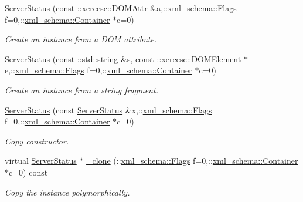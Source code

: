 \begin{DoxyCompactItemize}
\hyperlink{classopenstack_1_1xml_1_1ServerStatus_a18de8828142096479b1a0a79980ad557}{ServerStatus} (const ::xercesc::DOMAttr \&a,::\hyperlink{namespacexml__schema_affb4c227cbd9aa7453dd1dc5a1401943}{xml\_\-schema::Flags} f=0,::\hyperlink{namespacexml__schema_a333dea2213742aea47a37532dec4ec27}{xml\_\-schema::Container} $\ast$c=0)
\begin{DoxyCompactList}\small\item\em Create an instance from a DOM attribute. \item\end{DoxyCompactList}\item 
\hyperlink{classopenstack_1_1xml_1_1ServerStatus_a1a147728fb68d1f9d61eee5f32bae836}{ServerStatus} (const ::std::string \&s, const ::xercesc::DOMElement $\ast$e,::\hyperlink{namespacexml__schema_affb4c227cbd9aa7453dd1dc5a1401943}{xml\_\-schema::Flags} f=0,::\hyperlink{namespacexml__schema_a333dea2213742aea47a37532dec4ec27}{xml\_\-schema::Container} $\ast$c=0)
\begin{DoxyCompactList}\small\item\em Create an instance from a string fragment. \item\end{DoxyCompactList}\item 
\hyperlink{classopenstack_1_1xml_1_1ServerStatus_aeb999d1270a453047b82fbdaa75e25c2}{ServerStatus} (const \hyperlink{classopenstack_1_1xml_1_1ServerStatus}{ServerStatus} \&x,::\hyperlink{namespacexml__schema_affb4c227cbd9aa7453dd1dc5a1401943}{xml\_\-schema::Flags} f=0,::\hyperlink{namespacexml__schema_a333dea2213742aea47a37532dec4ec27}{xml\_\-schema::Container} $\ast$c=0)
\begin{DoxyCompactList}\small\item\em Copy constructor. \item\end{DoxyCompactList}\item 
virtual \hyperlink{classopenstack_1_1xml_1_1ServerStatus}{ServerStatus} $\ast$ \hyperlink{classopenstack_1_1xml_1_1ServerStatus_adc79cc3185058e62ac26126d495cf686}{\_\-clone} (::\hyperlink{namespacexml__schema_affb4c227cbd9aa7453dd1dc5a1401943}{xml\_\-schema::Flags} f=0,::\hyperlink{namespacexml__schema_a333dea2213742aea47a37532dec4ec27}{xml\_\-schema::Container} $\ast$c=0) const 
\begin{DoxyCompactList}\small\item\em Copy the instance polymorphically. \item\end{DoxyCompactList}\item 

\end{DoxyCompactItemize}
